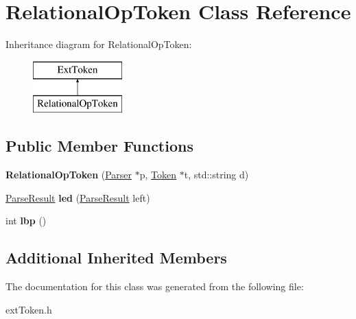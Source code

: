 \hypertarget{class_relational_op_token}{}\section{Relational\+Op\+Token Class Reference}
\label{class_relational_op_token}
Inheritance diagram for Relational\+Op\+Token\+:\begin{figure}[H]
\begin{center}
\leavevmode
\includegraphics[height=2.000000cm]{class_relational_op_token}
\end{center}
\end{figure}
\subsection*{Public Member Functions}
\begin{DoxyCompactItemize}
\item 
\hypertarget{class_relational_op_token_a1ede45cf178138ff12beba209681be51}{}{\bfseries Relational\+Op\+Token} (\hyperlink{class_parser}{Parser} $\ast$p, \hyperlink{class_token}{Token} $\ast$t, std\+::string d)\label{class_relational_op_token_a1ede45cf178138ff12beba209681be51}

\item 
\hypertarget{class_relational_op_token_a426c64391e7b3272d8e6277964730e05}{}\hyperlink{class_parse_result}{Parse\+Result} {\bfseries led} (\hyperlink{class_parse_result}{Parse\+Result} left)\label{class_relational_op_token_a426c64391e7b3272d8e6277964730e05}

\item 
\hypertarget{class_relational_op_token_ada096491d9553aea21089230489d6aef}{}int {\bfseries lbp} ()\label{class_relational_op_token_ada096491d9553aea21089230489d6aef}

\end{DoxyCompactItemize}
\subsection*{Additional Inherited Members}


The documentation for this class was generated from the following file\+:\begin{DoxyCompactItemize}
\item 
ext\+Token.\+h\end{DoxyCompactItemize}
